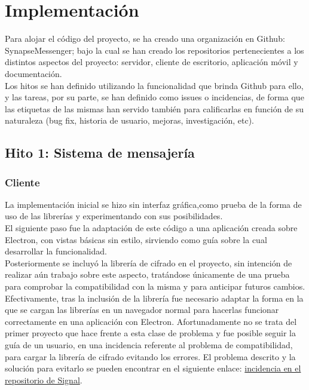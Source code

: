 \chapter{Implementación}

Para alojar el código del proyecto, se ha creado una organización en Github: SynapseMessenger; bajo la cual se han creado los repositorios pertenecientes a los distintos aspectos del proyecto: servidor, cliente de escritorio, aplicación móvil y documentación. \\ 


Los hitos se han definido utilizando la funcionalidad que brinda Github para ello, y las tareas, por su parte, se han definido como issues o incidencias, de forma que las etiquetas de las mismas han servido también para calificarlas en función de su naturaleza (bug fix, historia de usuario, mejoras, investigación, etc). \\

\section {Hito 1: Sistema de mensajería}

\subsection{Cliente}
La implementación inicial se hizo sin interfaz gráfica,como prueba de la forma de uso de las librerías y experimentando con sus posibilidades. \\

El siguiente paso fue la adaptación de este código a una aplicación creada sobre Electron, con vistas básicas sin estilo, sirviendo como guía sobre la cual desarrollar la funcionalidad. \\

Posteriormente se incluyó la librería de cifrado en el proyecto, sin intención de realizar aún trabajo sobre este aspecto, tratándose únicamente de una prueba para comprobar la compatibilidad con la misma y para anticipar futuros cambios. Efectivamente, tras la inclusión de la librería fue necesario adaptar la forma en la que se cargan las librerías en un navegador normal para hacerlas funcionar correctamente en una aplicación con Electron. Afortunadamente no se trata del primer proyecto que hace frente a esta clase de problema y fue posible seguir la guía de un usuario, en una incidencia referente al problema de compatibilidad, para cargar la librería de cifrado evitando los errores. El problema descrito y la solución para evitarlo se pueden encontrar en el siguiente enlace:
\href{https://github.com/WhisperSystems/libsignal-protocol-javascript/issues/6}{incidencia en el repositorio de Signal}. \\

